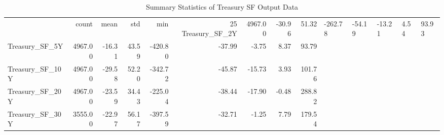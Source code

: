 \begin{table}
\caption{Summary Statistics of Treasury SF Output Data}
\label{tab:summary_output}
\begin{tabular}{lrrrrrrrr}
\toprule
 & count & mean & std & min & 25%
\midrule
Treasury_SF_2Y & 4967.00 & -30.96 & 51.32 & -262.78 & -54.19 & -13.21 & 4.54 & 93.93 \\
Treasury_SF_5Y & 4967.00 & -16.31 & 43.59 & -420.80 & -37.99 & -3.75 & 8.37 & 93.79 \\
Treasury_SF_10Y & 4967.00 & -29.58 & 52.20 & -342.72 & -45.87 & -15.73 & 3.93 & 101.76 \\
Treasury_SF_20Y & 4967.00 & -23.59 & 34.43 & -225.04 & -38.44 & -17.90 & -0.48 & 288.82 \\
Treasury_SF_30Y & 3555.00 & -22.97 & 56.17 & -397.59 & -32.71 & -1.25 & 7.79 & 179.54 \\
\bottomrule
\end{tabular}
\end{table}
